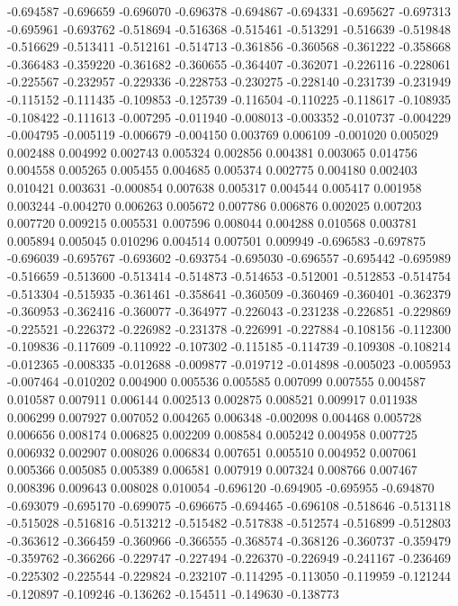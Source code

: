 -0.694587
-0.696659
-0.696070
-0.696378
-0.694867
-0.694331
-0.695627
-0.697313
-0.695961
-0.693762
-0.518694
-0.516368
-0.515461
-0.513291
-0.516639
-0.519848
-0.516629
-0.513411
-0.512161
-0.514713
-0.361856
-0.360568
-0.361222
-0.358668
-0.366483
-0.359220
-0.361682
-0.360655
-0.364407
-0.362071
-0.226116
-0.228061
-0.225567
-0.232957
-0.229336
-0.228753
-0.230275
-0.228140
-0.231739
-0.231949
-0.115152
-0.111435
-0.109853
-0.125739
-0.116504
-0.110225
-0.118617
-0.108935
-0.108422
-0.111613
-0.007295
-0.011940
-0.008013
-0.003352
-0.010737
-0.004229
-0.004795
-0.005119
-0.006679
-0.004150
0.003769
0.006109
-0.001020
0.005029
0.002488
0.004992
0.002743
0.005324
0.002856
0.004381
0.003065
0.014756
0.004558
0.005265
0.005455
0.004685
0.005374
0.002775
0.004180
0.002403
0.010421
0.003631
-0.000854
0.007638
0.005317
0.004544
0.005417
0.001958
0.003244
-0.004270
0.006263
0.005672
0.007786
0.006876
0.002025
0.007203
0.007720
0.009215
0.005531
0.007596
0.008044
0.004288
0.010568
0.003781
0.005894
0.005045
0.010296
0.004514
0.007501
0.009949
-0.696583
-0.697875
-0.696039
-0.695767
-0.693602
-0.693754
-0.695030
-0.696557
-0.695442
-0.695989
-0.516659
-0.513600
-0.513414
-0.514873
-0.514653
-0.512001
-0.512853
-0.514754
-0.513304
-0.515935
-0.361461
-0.358641
-0.360509
-0.360469
-0.360401
-0.362379
-0.360953
-0.362416
-0.360077
-0.364977
-0.226043
-0.231238
-0.226851
-0.229869
-0.225521
-0.226372
-0.226982
-0.231378
-0.226991
-0.227884
-0.108156
-0.112300
-0.109836
-0.117609
-0.110922
-0.107302
-0.115185
-0.114739
-0.109308
-0.108214
-0.012365
-0.008335
-0.012688
-0.009877
-0.019712
-0.014898
-0.005023
-0.005953
-0.007464
-0.010202
0.004900
0.005536
0.005585
0.007099
0.007555
0.004587
0.010587
0.007911
0.006144
0.002513
0.002875
0.008521
0.009917
0.011938
0.006299
0.007927
0.007052
0.004265
0.006348
-0.002098
0.004468
0.005728
0.006656
0.008174
0.006825
0.002209
0.008584
0.005242
0.004958
0.007725
0.006932
0.002907
0.008026
0.006834
0.007651
0.005510
0.004952
0.007061
0.005366
0.005085
0.005389
0.006581
0.007919
0.007324
0.008766
0.007467
0.008396
0.009643
0.008028
0.010054
-0.696120
-0.694905
-0.695955
-0.694870
-0.693079
-0.695170
-0.699075
-0.696675
-0.694465
-0.696108
-0.518646
-0.513118
-0.515028
-0.516816
-0.513212
-0.515482
-0.517838
-0.512574
-0.516899
-0.512803
-0.363612
-0.366459
-0.360966
-0.366555
-0.368574
-0.368126
-0.360737
-0.359479
-0.359762
-0.366266
-0.229747
-0.227494
-0.226370
-0.226949
-0.241167
-0.236469
-0.225302
-0.225544
-0.229824
-0.232107
-0.114295
-0.113050
-0.119959
-0.121244
-0.120897
-0.109246
-0.136262
-0.154511
-0.149630
-0.138773
